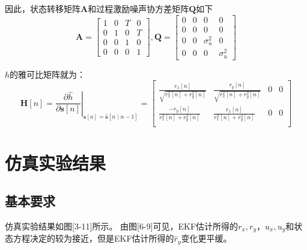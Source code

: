 \documentclass{article}
\begin{document}
因此，状态转移矩阵$\mathbf{A}$和过程激励噪声协方差矩阵$\mathbf{Q}$如下
\begin{equation}
    \mathbf{A}=\left[\begin{array}{llll}
    1 & 0 & T & 0 \\
    0 & 1 & 0 & T \\
    0 & 0 & 1 & 0 \\
    0 & 0 & 0 & 1
    \end{array}\right], \mathbf{Q}=\left[\begin{array}{cccc}
    0 & 0 & 0 & 0 \\
    0 & 0 & 0 & 0 \\
    0 & 0 & \sigma_{u}^{2} & 0 \\
    0 & 0 & 0 & \sigma_{u}^{2}
    \end{array}\right]
\end{equation}

$h$的雅可比矩阵就为：
\begin{equation}
    \mathbf{H}[n]=\left.\frac{\partial \hat{h}}{\partial \mathbf{s}[n]}\right|_{\mathbf{s}[n]=\mathbf{\hat{s}}[n \mid n-1]} 
    =\left[\begin{array}{llll}
    \frac{r_{x}[n]}{\sqrt{r_{x}^{2}[n]+r_{y}^{2}[n]}} & \frac{r_{y}[n]}{\sqrt{r_{x}^{2}[n]+r_{y}^{2}[n]}} & 0 & 0\\
    \frac{-r_{y}[n]}{r_{x}^{2}[n]+r_{y}^{2}[n]} & \frac{r_{x}[n]}{r_{x}^{2}[n]+r_{y}^{2}[n]} & 0 & 0\\
    \end{array}\right]
\end{equation}

\section{仿真实验结果}
\subsection{基本要求}
仿真实验结果如图[3-11]所示。
由图[6-9]可见，EKF估计所得的$r_x,r_y，u_x,u_y$和状态方程决定的较为接近，但是EKF估计所得的$\hat{r}_y$变化更平缓。
\end{document}
